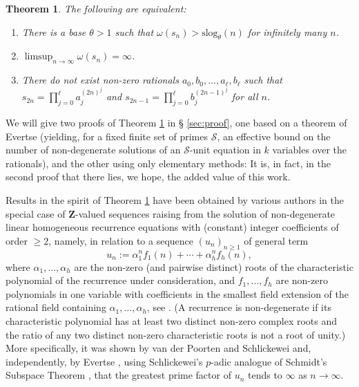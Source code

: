\documentclass[reqno]{amsart}
\newtheorem{theorem}{Theorem}%
\theoremstyle{remark}
\providecommand{\ZZb}{\mathbf{Z}}
\newcommand{\slog}{\mathrm{slog}}
\begin{document}
\begin{theorem}\label{th:main}
The following are equivalent:
\begin{enumerate}[label={\rm (\alph{*})}]
\item\label{it:main-theorem(b)} There is a base $\theta > 1$ such that $\omega(s_n)>\slog_\theta(n)$ for infinitely many $n$.
\item\label{it:main-theorem(c)} $\limsup_{n \to \infty} \omega(s_n) = \infty$.
\item\label{it:main-theorem(d)} There do not exist non-zero rationals $a_0,b_0,\ldots,a_\ell,b_\ell$ such that $s_{2n}=\prod_{j=0}^\ell a_j^{(2n)^j}$ and $s_{2n-1}=\prod_{j=0}^\ell b_j^{(2n-1)^j}$ for all $n$.
\end{enumerate}
\end{theorem}
%
We will give two proofs of Theorem \ref{th:main} in \S{ }\ref{sec:proof}, one based on a theorem of Evertse (yielding, for a fixed finite set of primes $\mathcal S$, an effective bound on the number of non-degenerate solutions of an $\mathcal S$-unit equation in $k$ variables over the rationals), and the other using only elementary methods: It is, in fact, in the second proof that there lies, we hope, the added value of this work.

Results in the spirit of Theorem \ref{th:main} have been obtained by various authors in the special case of $\ZZb$-valued sequences raising from the solution of non-degenerate linear homogeneous recurrence equations with (constant) integer coefficients of order $\ge 2$, namely, in relation to a sequence $(u_n)_{n \ge 1}$ of general term
%
\begin{equation}
\label{equ:stewarts_equ}
u_n := \alpha_1^n f_1(n)  + \cdots + \alpha_h^n f_h(n),
\end{equation}
%
where $\alpha_1, \ldots, \alpha_h$ are the non-zero (and pairwise distinct) roots of the characteristic polynomial of the recurrence under consideration, and $f_1, \ldots, f_h$ are non-zero polynomials in one variable with coefficients in the smallest field extension of the rational field containing $\alpha_1, \ldots, \alpha_h$, see \cite[Theorem C.1]{ShTij}.
(A recurrence is non-degenerate if its characteristic polynomial has at least two distinct non-zero complex roots and the ratio of any two distinct non-zero characteristic roots is not a root of unity.)
More specifically, it was shown by van der Poorten and Schlickewei \cite{vanderP82} and, independently, by Evertse \cite[Corollary 3]{evertse84}, using Schlickewei's $p$-adic analogue of Schmidt's Subspace Theorem \cite{schli76}, that the greatest prime factor of $u_n$ tends to $\infty$ as $n \to \infty$.
\end{document}
